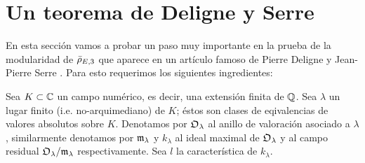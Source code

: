 \documentclass[../../tesis_maestria]{subfiles}
\begin{document}
\section{Un teorema de Deligne y Serre}\label{sec:DeligneSerre}%

En esta secci\'on vamos a probar un paso muy importante en la prueba de la modularidad de $\bar{\rho}_{E,3}$
que aparece en un art\'iculo famoso de Pierre Deligne y Jean-Pierre Serre
\cite[Teorema 6.7, \S6, pg. 521]{DeligneSerreFMDP1}. Para esto requerimos los siguientes ingredientes:

Sea $K\subset\mathbb{C}$ un campo num\'erico, es decir, una extensi\'on finita de $\mathbb{Q}$. Sea $\lambda$ un
lugar finito (i.e. no-arquimediano) de $K$; \'estos son clases de eqivalencias de valores absolutos
sobre $K$. Denotamos por $\mathfrak{O}_{\lambda}$ al anillo de valoraci\'on asociado a $\lambda$, similarmente
denotamos por $\mathfrak{m}_{\lambda}$ y $k_{\lambda}$ al ideal maximal de $\mathfrak{O}_{\lambda}$ y al campo residual
$\mathfrak{O}_{\lambda}/\mathfrak{m}_{\lambda}$ respectivamente. Sea $l$ la caracter\'istica de $k_{\lambda}$.
\end{document}
